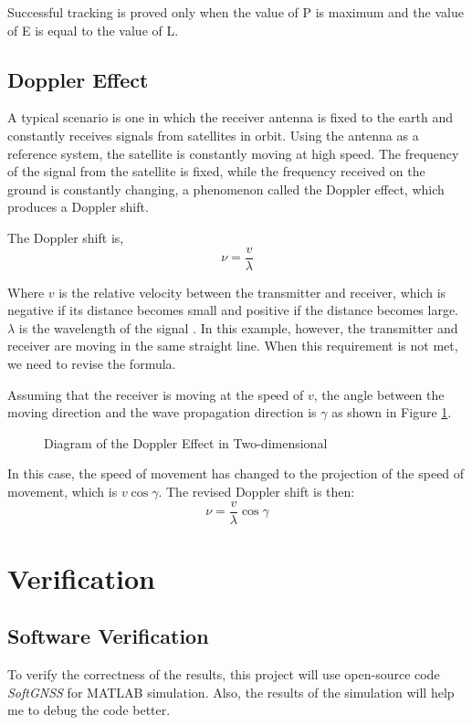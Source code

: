 Successful tracking is proved only when the value of P is maximum and the value of E is equal to the value of L.

\subsection{Doppler Effect}
A typical scenario is one in which the receiver antenna is fixed to the earth and constantly receives signals from satellites in orbit. Using the antenna as a reference system, the satellite is constantly moving at high speed. The frequency of the signal from the satellite is fixed, while the frequency received on the ground is constantly changing, a phenomenon called the Doppler effect, which produces a Doppler shift.

The Doppler shift is,
\begin{equation}
    \nu =\frac{v}{\lambda}
\end{equation}

Where $v$ is the relative velocity between the transmitter and receiver, which is negative if its distance becomes small and positive if the distance becomes large. $\lambda$ is the wavelength of the signal \cite{RN203}. In this example, however, the transmitter and receiver are moving in the same straight line. When this requirement is not met, we need to revise the formula.

Assuming that the receiver is moving at the speed of $v$, the angle between the moving direction and the wave propagation direction is $\gamma$ as shown in Figure \ref{fig:doppler}.

\begin{figure}[!htbp]
    \centering
    
    \caption{Diagram of the Doppler Effect in Two-dimensional}
    \label{fig:doppler}
\end{figure}

In this case, the speed of movement has changed to the projection of the speed of movement, which is $v\cos\gamma$. The revised Doppler shift is then:
\begin{equation}
    \nu =\frac{v}{\lambda}\cos\gamma
\end{equation}

\section{Verification}
\subsection{Software Verification}
To verify the correctness of the results, this project will use open-source code \textit{SoftGNSS} for MATLAB simulation. Also, the results of the simulation will help me to debug the code better.

